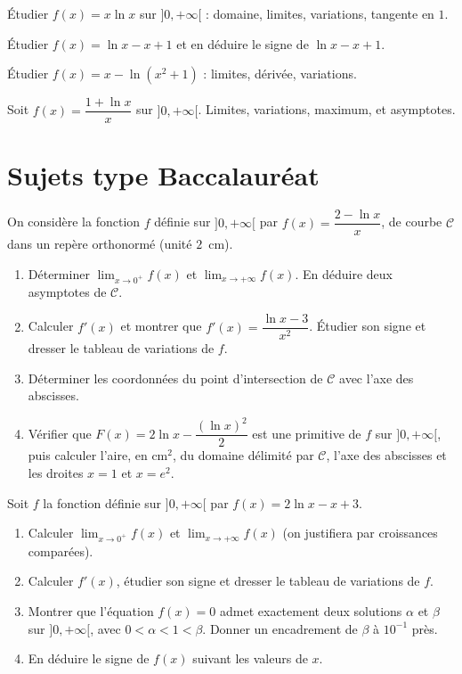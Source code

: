 \exo{} Étudier $f(x)=x\ln x$ sur $]0,+\infty[$ : domaine, limites, variations,
tangente en $1$.

\exo{} Étudier $f(x)=\ln x-x+1$ et en déduire le signe de $\ln x-x+1$.

\exo{} Étudier $f(x)=x-\ln(x^{2}+1)$ : limites, dérivée, variations.

\exo{} Soit $f(x)=\dfrac{1+\ln x}{x}$ sur $]0,+\infty[$. Limites, variations,
maximum, et asymptotes.

\section{Sujets type Baccalauréat}

On considère la fonction $f$ définie sur $]0,+\infty[$ par $f(x)=\dfrac{2-\ln x}{x}$,
de courbe $\mathcal C$ dans un repère orthonormé (unité $2$~cm).
\begin{enumerate}[label=\arabic*)]
\item Déterminer $\displaystyle\lim_{x\to0^{+}}f(x)$ et $\displaystyle\lim_{x\to+\infty}f(x)$.
En déduire deux asymptotes de $\mathcal C$.
\item Calculer $f'(x)$ et montrer que $f'(x)=\dfrac{\ln x-3}{x^{2}}$. Étudier son signe et
dresser le tableau de variations de $f$.
\item Déterminer les coordonnées du point d'intersection de $\mathcal C$ avec l'axe des
abscisses.
\item Vérifier que $F(x)=2\ln x-\dfrac{(\ln x)^{2}}{2}$ est une primitive de $f$ sur
$]0,+\infty[$, puis calculer l'aire, en cm$^2$, du domaine délimité par $\mathcal C$,
l'axe des abscisses et les droites $x=1$ et $x=e^{2}$.
\end{enumerate}

Soit $f$ la fonction définie sur $]0,+\infty[$ par $f(x)=2\ln x-x+3$.
\begin{enumerate}[label=\arabic*)]
\item Calculer $\displaystyle\lim_{x\to0^{+}}f(x)$ et $\displaystyle\lim_{x\to+\infty}f(x)$
(on justifiera par croissances comparées).
\item Calculer $f'(x)$, étudier son signe et dresser le tableau de variations de $f$.
\item Montrer que l'équation $f(x)=0$ admet exactement deux solutions $\alpha$ et $\beta$
sur $]0,+\infty[$, avec $0<\alpha<1<\beta$. Donner un encadrement de $\beta$ à $10^{-1}$
près.
\item En déduire le signe de $f(x)$ suivant les valeurs de $x$.
\end{enumerate}

